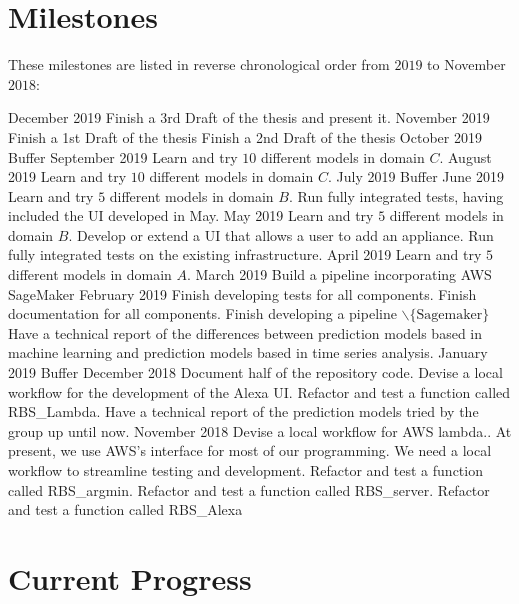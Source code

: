 \documentclass[a4paper]{article}
\begin{document}
\section{Milestones}

These milestones are listed in reverse chronological order from $2019$ to November $2018$:

\begin{outline}
    \1 December 2019
    \2 Finish a 3rd Draft of the thesis and present it.
    \1 November 2019
    \2 Finish a 1st Draft of the thesis 
    \2 Finish a 2nd Draft of the thesis 
    \1 October 2019
    \2 Buffer 
    \1 September 2019
    \2 Learn and try $10$ different models in domain $C$.
    \1 August 2019
    \2 Learn and try $10$ different models in domain $C$.
    \1 July 2019
    \2 Buffer
    \1 June 2019
    \2 Learn and try $5$ different models in domain $B$.
    \2 Run fully integrated tests, having included the UI developed in May.
    \1 May 2019
    \2 Learn and try $5$ different models in domain $B$.
    \2 Develop or extend a UI that allows a user to add an appliance.
    \2 Run fully integrated tests on the existing infrastructure.
    \1 April 2019
    \2 Learn and try $5$ different models in domain $A$.
    \1 March 2019
    \2 Build a pipeline incorporating AWS SageMaker
    \1 February 2019
    \2 Finish developing tests for all components.
    \2 Finish documentation for all components.
    \2 Finish developing a pipeline $\smallsetminus \{\text{Sagemaker}\}$
    \2 Have a technical report of the differences between prediction models based in machine learning and prediction models based in time series analysis.
    \1 January 2019
    \2 Buffer
    \1 December 2018
    \2 Document half of the repository code.
    \2 Devise a local workflow for the development of the Alexa UI.
    \2 Refactor and test a function called RBS\_Lambda.
    \2 Have a technical report of the prediction models tried by the group up until now.
    \1 November 2018
    \2 Devise a local workflow for AWS lambda.. At present, we use AWS's interface for most of our programming. We need a local workflow to
    streamline testing and development.
    \2 Refactor and test a function called RBS\_argmin.
    \2 Refactor and test a function called RBS\_server.
    \2 Refactor and test a function called RBS\_Alexa
\end{outline}


\section{Current Progress}
\end{document}
